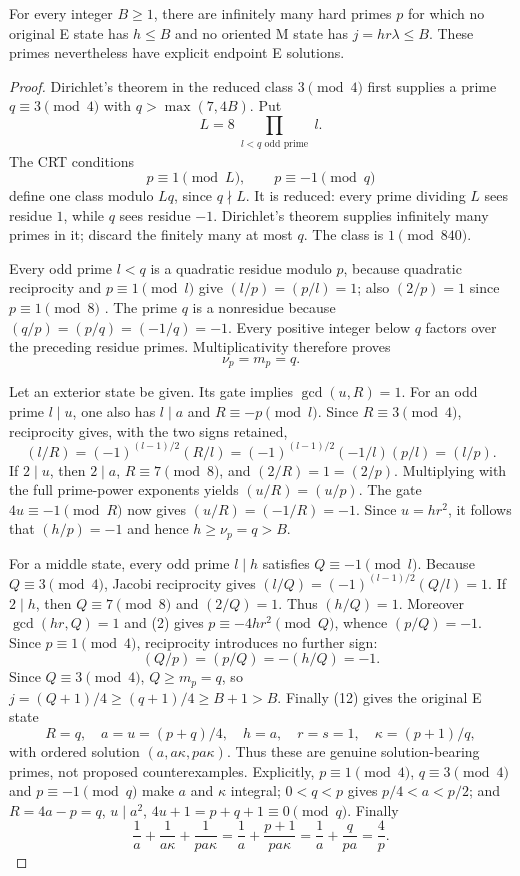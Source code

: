 \begin{theorem}
For every integer $B\ge1$, there are infinitely many hard primes $p$ for which
no original E state has $h\le B$ and no oriented M state has $j=hr\lambda\le B$.
These primes nevertheless have explicit endpoint E solutions.
\end{theorem}
\begin{proof}
Dirichlet's theorem in the reduced class $3\pmod4$ first supplies a prime
$q\equiv3\pmod4$ with $q>\max(7,4B)$. Put
\[
 L=8\prod_{\substack{l<q\text{ odd prime}}}l.
\]
The CRT conditions
\[
 p\equiv1\pmod L,\qquad p\equiv-1\pmod q                \tag{12}
\]
define one class modulo $Lq$, since $q\nmid L$. It is reduced: every prime
dividing $L$ sees residue $1$, while $q$ sees residue $-1$. Dirichlet's theorem
\cite[Theorem 18.1]{Dirichlet} supplies infinitely many primes in it; discard
the finitely many at most $q$. The class is $1\pmod{840}$.

Every odd prime $l<q$ is a quadratic residue modulo $p$, because quadratic
reciprocity and $p\equiv1\pmod l$ give
$(l/p)=(p/l)=1$; also $(2/p)=1$ since $p\equiv1\pmod8$
\cite[\S6.4, especially pp.~207--213]{Hatcher}. The prime $q$ is a nonresidue because
$(q/p)=(p/q)=(-1/q)=-1$. Every positive integer below $q$ factors over the
preceding residue primes. Multiplicativity therefore proves
\[
 \nu_p=m_p=q.
\]

Let an exterior state be given.  Its gate implies $\gcd(u,R)=1$.  For an odd
prime $l\mid u$, one also has $l\mid a$ and $R\equiv-p\pmod l$.  Since
$R\equiv3\pmod4$, reciprocity gives, with the two signs retained,
\[
 (l/R)=(-1)^{(l-1)/2}(R/l)
       =(-1)^{(l-1)/2}(-1/l)(p/l)=(l/p).
\]
If $2\mid u$, then $2\mid a$, $R\equiv7\pmod8$, and
$(2/R)=1=(2/p)$. Multiplying with the full prime-power exponents yields
$(u/R)=(u/p)$. The gate $4u\equiv-1\pmod R$ now gives
$(u/R)=(-1/R)=-1$. Since $u=hr^2$, it follows that $(h/p)=-1$ and hence
$h\ge\nu_p=q>B$.

For a middle state, every odd prime $l\mid h$ satisfies $Q\equiv-1\pmod l$.
Because $Q\equiv3\pmod4$, Jacobi reciprocity gives
$(l/Q)=(-1)^{(l-1)/2}(Q/l)=1$. If $2\mid h$, then
$Q\equiv7\pmod8$ and $(2/Q)=1$. Thus $(h/Q)=1$. Moreover
$\gcd(hr,Q)=1$ and (2) gives $p\equiv-4hr^2\pmod Q$, whence
$(p/Q)=-1$. Since $p\equiv1\pmod4$, reciprocity introduces no further sign:
\[
 (Q/p)=(p/Q)=-(h/Q)=-1.
\]
Since $Q\equiv3\pmod4$, $Q\ge m_p=q$, so
$j=(Q+1)/4\ge(q+1)/4\ge B+1>B$.
Finally (12) gives the original E state
\[
 R=q,\quad a=u=(p+q)/4,\quad h=a,\quad r=s=1,
 \quad\kappa=(p+1)/q,
\]
with ordered solution $(a,a\kappa,pa\kappa)$. Thus these are genuine
solution-bearing primes, not proposed counterexamples.  Explicitly,
$p\equiv1\pmod4$, $q\equiv3\pmod4$ and $p\equiv-1\pmod q$ make
$a$ and $\kappa$ integral; $0<q<p$ gives $p/4<a<p/2$; and
$R=4a-p=q$, $u\mid a^2$, $4u+1=p+q+1\equiv0\pmod q$. Finally
\[
 \frac1a+\frac1{a\kappa}+\frac1{pa\kappa}
 =\frac1a+\frac{p+1}{pa\kappa}
 =\frac1a+\frac q{pa}=\frac4p.
\]
\end{proof}

